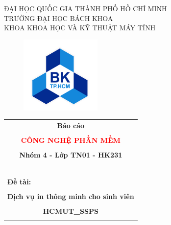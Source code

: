\documentclass[a4paper]{article}
\begin{document}
\begin{titlepage}
\begin{center}
    ĐẠI HỌC QUỐC GIA THÀNH PHỐ HỒ CHÍ MINH \\
    TRƯỜNG ĐẠI HỌC BÁCH KHOA \\
    KHOA KHOA HỌC VÀ KỸ THUẬT MÁY TÍNH 
\end{center}

\vspace{0.2cm}

\begin{figure}[h!]
\begin{center}
\includegraphics[width=4cm]{hcmut.png}
\end{center}
\end{figure}

\begin{center}
\begin{tabular}{c}
\multicolumn{1}{c}{\textbf{{\huge Báo cáo}}}\\\\
\multicolumn{1}{c}{\textcolor{red}{\textbf{{\huge CÔNG NGHỆ PHẦN MỀM}}}}\\\\
\multicolumn{1}{c}{\textbf{{\Large Nhóm 4 - Lớp TN01 - HK231}}}\\

~~\\
\hline
\\
\multicolumn{1}{l}{\textbf{{\large Đề tài:}}}\\\\
\huge{\hspace{0.5cm}\textbf{Dịch vụ in thông minh cho sinh viên}}\\\\
\huge{\textbf{HCMUT\_SSPS}}\\\\

\hline
\end{tabular}
\end{center}

\vspace{0.5cm}


\end{titlepage}
\end{document}
